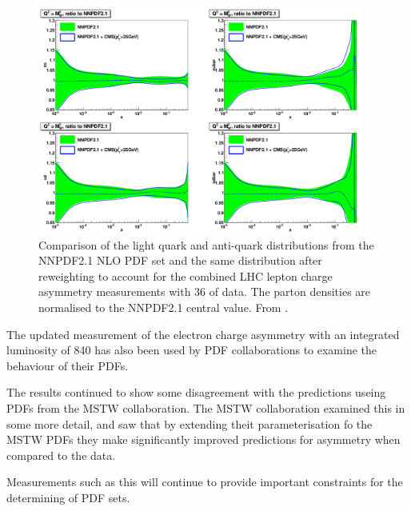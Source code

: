 \begin{figure}[htbp]
  \begin{center}
  \includegraphics*[width=0.95\textwidth]{effect}
  \caption[Comparison of the light quark and anti-quark distributions from the
NNPDF2.1 NLO PDF set and the same distribution after reweighting to account for
the LHC lepton charge asymmetry measurements with \unit{36}{\invpb} of data.]
{Comparison of the light quark and anti-quark distributions from the NNPDF2.1
NLO PDF set and the same distribution after reweighting to account for the
combined LHC lepton charge asymmetry measurements with \unit{36}{\invpb} of
data.  The parton densities are normalised to the NNPDF2.1 central value.  From
\cite{Ball:2011gg}. } \label{fig:effect}
  \end{center}
\end{figure}

The updated measurement of the electron charge asymmetry with an integrated luminosity of
\unit{840}{\invpb} has also been used by PDF collaborations to examine the
behaviour of their PDFs.

The results continued to show some disagreement with the predictions useing PDFs
from the MSTW collaboration. 
The MSTW collaboration examined this in some more
detail, and saw that by extending theit parameterisation fo the MSTW PDFs they
make significantly improved predictions for asymmetry when compared to the data.

\FigureRef{}

Measurements such as this will continue to provide important constraints for the
determining of PDF sets.


